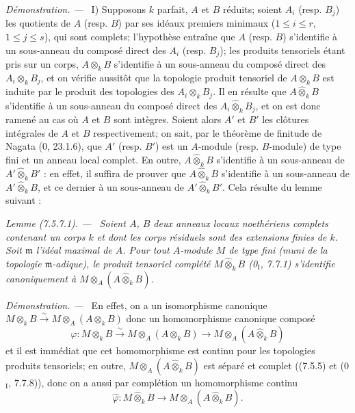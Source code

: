 \documentclass[10pt,oneside]{book}
\newenvironment{lemma}[1][]{%
  \par\medskip\noindent\itshape Lemme (#1). ---\ }{\par}
\newenvironment{proof}{%
  \par\medskip\noindent\textit{Démonstration. ---\ }}{\par}
\begin{document}
\begin{proof}
I) Supposons $k$ parfait, $A$ et $B$ réduits; soient $A_i$ (resp. $B_j$) les
quotients de $A$ (resp. $B$) par ses idéaux premiers minimaux
($1\leq i\leq r$, $1\leq j\leq s$), qui sont complets; l'hypothèse entraîne
que $A$ (resp. $B$) s'identifie à un sous-anneau du composé direct des $A_i$
(resp. $B_j$); les produits tensoriels étant pris sur un corps,
$A\otimes_kB$ s'identifie à un sous-anneau du composé direct des
$A_i\otimes_kB_j$, et on vérifie aussitôt que la topologie produit tensoriel
de $A\otimes_kB$ est induite par le produit des topologies des
$A_i\otimes_kB_j$. Il en résulte que $A\widehat\otimes_kB$ s'identifie à un
sous-anneau du composé direct des $A_i\widehat\otimes_kB_j$, et on est donc
ramené au cas où $A$ et $B$ sont intègres. Soient alors $A'$ et $B'$ les
clôtures intégrales de $A$ et $B$ respectivement; on sait, par le théorème de
finitude de Nagata (0, 23.1.6), que $A'$ (resp. $B'$) est un $A$-module (resp.
$B$-module) de type fini et un anneau local complet. En outre,
$A\widehat\otimes_kB$ s'identifie à un sous-anneau de
$A'\widehat\otimes_kB'$ : en effet, il suffira de prouver que
$A\widehat\otimes_kB$ s'identifie à un sous-anneau de
$A'\widehat\otimes_kB$, et ce dernier à un sous-anneau de
$A'\widehat\otimes_kB'$. Cela résulte du lemme suivant :

\begin{lemma}[7.5.7.1]
\label{IV.2.s7.5.7.1-fr}
Soient $A$, $B$ deux anneaux locaux noethériens complets contenant un corps
$k$ et dont les corps résiduels sont des extensions finies de $k$. Soit
$\mathfrak m$ l'idéal maximal de $A$. Pour tout $A$-module $M$ de type fini
(muni de la topologie $\mathfrak m$-adique), le produit tensoriel complété
$M\widehat\otimes_kB$ (0$_{\mathrm I}$, 7.7.1) s'identifie canoniquement à
$M\otimes_A(A\widehat\otimes_kB)$.
\end{lemma}

\begin{proof}
En effet, on a un isomorphisme canonique
$M\otimes_kB\xrightarrow{\sim}M\otimes_A(A\otimes_kB)$ donc un homomorphisme
canonique composé
\[
\varphi:M\otimes_kB\xrightarrow{\sim}M\otimes_A(A\otimes_kB)
\longrightarrow M\otimes_A(A\widehat\otimes_kB)
\]
et il est immédiat que cet homomorphisme est continu pour les topologies
produits tensoriels; en outre, $M\otimes_A(A\widehat\otimes_kB)$ est séparé et
complet ((7.5.5) et (0$_{\mathrm I}$, 7.7.8)), donc on a aussi par complétion
un homomorphisme continu
\[
\widehat\varphi:M\widehat\otimes_kB\longrightarrow
M\otimes_A(A\widehat\otimes_kB).
\]


\end{proof}
\end{proof}
\end{document}
